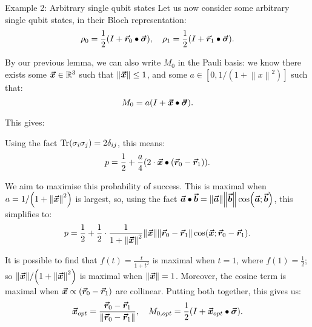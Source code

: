 \documentclass[a4paper]{article}
\begin{document}
\begin{parag}{Example 2: Arbitrary single qubit states}
    Let us now consider some arbitrary single qubit states, in their Bloch representation: 
    \[\rho_0 = \frac{1}{2}\left(I + \bvec{r}_0 \dotprod \bvec{\sigma}\right), \mathspace \rho_1 = \frac{1}{2}\left(I + \bvec{r}_1 \dotprod \bvec{\sigma}\right).\]

    By our previous lemma, we can also write $M_0$ in the Pauli basis: we know there exists some $\bm{\protect\vec{x}} \in \mathbb{R}^3$ such that $\left\|\bvec{x}\right\| \leq 1$, and some $a \in \left[0, 1/\left(1 + \left\|x\right\|^2\right)\right]$ such that: 
    \[M_0 = a\left(I + \bvec{x} \dotprod \bvec{\sigma}\right).\]
    
    This gives: 
    
    Using the fact $\Tr\left(\sigma_i \sigma_j\right) = 2 \delta_{ij}$, this means: 
    \[p = \frac{1}{2} + \frac{a}{4}\left(2\cdot \bvec{x} \dotprod \left(\bvec{r}_0 - \bvec{r}_1\right)\right).\]

    We aim to maximise this probability of success. This is maximal when $a = 1/\left(1 + \left\|\bvec{x}\right\|^2\right)$ is largest, so, using the fact $\bvec{a} \dotprod \bvec{b} = \left\|\bvec{a}\right\| \left\|\bvec{b}\right\| \cos\left(\bvec{a}; \bvec{b}\right)$, this simplifies to: 
    \[p = \frac{1}{2} + \frac{1}{2} \cdot \frac{1}{1 + \left\|\bvec{x}\right\|^2} \left\|\bvec{x}\right\| \left\|\bvec{r}_0 - \bvec{r}_1\right\| \cos\left(\bvec{x}; \bvec{r}_0 - \bvec{r}_1\right).\]
    
    It is possible to find that $f\left(t\right) = \frac{t}{1 + t^2}$ is maximal when $t = 1$, where $f\left(1\right) = \frac{1}{2}$; so $\left\|\bvec{x}\right\| / \left(1 + \left\|\bvec{x}\right\|^2\right)$ is maximal when $\left\|\bvec{x}\right\| = 1$. Moreover, the cosine term is maximal when $\bvec{x} \propto \left(\bvec{r}_0 - \bvec{r}_1\right)$ are collinear. Putting both together, this gives us:
    \[\bvec{x}_{opt} = \frac{\bvec{r}_0 - \bvec{r}_1}{\left\|\bvec{r}_0 - \bvec{r}_1\right\|}, \mathspace M_{0, opt} = \frac{1}{2}\left(I + \bvec{x}_{opt} \dotprod \bvec{\sigma}\right).\]
    

\end{parag}
\end{document}
